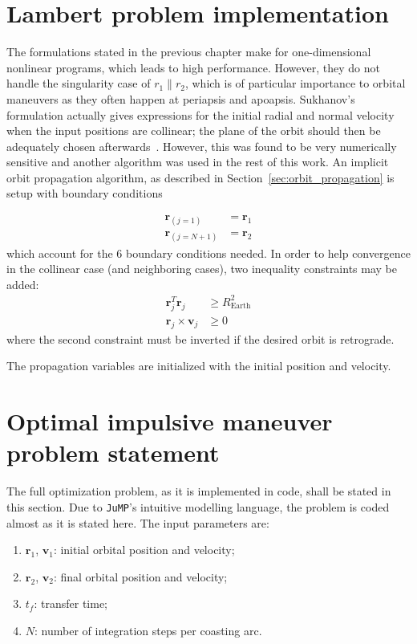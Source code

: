 \section{Lambert problem implementation}

The formulations stated in the previous chapter make for one-dimensional nonlinear programs, which leads to high performance. However, they do not handle the singularity case of \(r_1 \parallel r_2\), which is of particular importance to orbital maneuvers as they often happen at periapsis and apoapsis. Sukhanov's formulation actually gives expressions for the initial radial and normal velocity when the input positions are collinear; the plane of the orbit should then be adequately chosen afterwards~\cite{sukhanov}. However, this was found to be very numerically sensitive and another algorithm was used in the rest of this work. An implicit orbit propagation algorithm, as described in Section~\ref{sec:orbit_propagation} is setup with boundary conditions

\begin{align}
    \mathbf{r}_{(j=1)}   &= \mathbf{r}_1 \\
    \mathbf{r}_{(j=N+1)} &= \mathbf{r}_2
\end{align}
which account for the 6 boundary conditions needed. In order to help convergence in the collinear case (and neighboring cases), two inequality constraints may be added:
\begin{align}
    \mathbf{r}_j^T \mathbf{r}_j &\geq R_{\text{Earth}}^2 \\
    \mathbf{r}_j \times \mathbf{v}_j &\geq 0
\end{align}
where the second constraint must be inverted if the desired orbit is retrograde. 

The propagation variables are initialized with the initial position and velocity.

\section{Optimal impulsive maneuver problem statement}\label{sec:impulsive_statement}

The full optimization problem, as it is implemented in code, shall be stated in this section. Due to \texttt{JuMP}'s intuitive modelling language, the problem is coded almost as it is stated here. The input parameters are:
\begin{enumerate}
    \item \(\mathbf{r}_1\), \(\mathbf{v}_1\): initial orbital position and velocity;
    \item \(\mathbf{r}_2\), \(\mathbf{v}_2\): final orbital position and velocity;
    \item \(t_f\): transfer time;
    \item \(N\): number of integration steps per coasting arc.
\end{enumerate}

